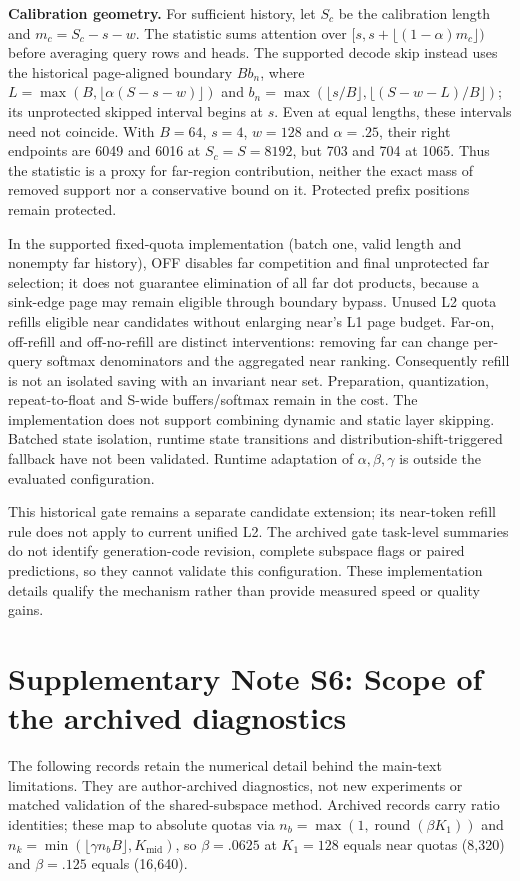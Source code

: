 \documentclass[10pt,letterpaper]{article}
\begin{document}
\textbf{Calibration geometry.} For sufficient history, let $S_c$ be the calibration length and $m_c=S_c-s-w$. The statistic sums attention over $[s,s+\lfloor(1-\alpha)m_c\rfloor)$ before averaging query rows and heads. The supported decode skip instead uses the historical page-aligned boundary $Bb_n$, where $L=\max(B,\lfloor\alpha(S-s-w)\rfloor)$ and $b_n=\max(\lfloor s/B\rfloor,\lfloor(S-w-L)/B\rfloor)$; its unprotected skipped interval begins at $s$. Even at equal lengths, these intervals need not coincide. With $B=64$, $s=4$, $w=128$ and $\alpha=.25$, their right endpoints are 6049 and 6016 at $S_c=S=8192$, but 703 and 704 at 1065. Thus the statistic is a proxy for far-region contribution, neither the exact mass of removed support nor a conservative bound on it. Protected prefix positions remain protected.

In the supported fixed-quota implementation (batch one, valid length and nonempty far history), OFF disables far competition and final unprotected far selection; it does not guarantee elimination of all far dot products, because a sink-edge page may remain eligible through boundary bypass. Unused L2 quota refills eligible near candidates without enlarging near's L1 page budget. Far-on, off-refill and off-no-refill are distinct interventions: removing far can change per-query softmax denominators and the aggregated near ranking. Consequently refill is not an isolated saving with an invariant near set. Preparation, quantization, repeat-to-float and S-wide buffers/softmax remain in the cost. The implementation does not support combining dynamic and static layer skipping. Batched state isolation, runtime state transitions and distribution-shift-triggered fallback have not been validated. Runtime adaptation of $\alpha,\beta,\gamma$ is outside the evaluated configuration.


This historical gate remains a separate candidate extension; its near-token refill rule does not apply to current unified L2. The archived gate task-level summaries do not identify generation-code revision, complete subspace flags or paired predictions, so they cannot validate this configuration. These implementation details qualify the mechanism rather than provide measured speed or quality gains.

\clearpage
\section*{Supplementary Note S6: Scope of the archived diagnostics}
The following records retain the numerical detail behind the main-text limitations. They are author-archived diagnostics, not new experiments or matched validation of the shared-subspace method. Archived records carry ratio identities; these map to absolute quotas via $n_b=\max(1,\operatorname{round}(\beta K_1))$ and $n_k=\min(\lfloor\gamma n_bB\rfloor,K_{\mathrm{mid}})$, so $\beta=.0625$ at $K_1=128$ equals near quotas (8,320) and $\beta=.125$ equals (16,640).
\end{document}
